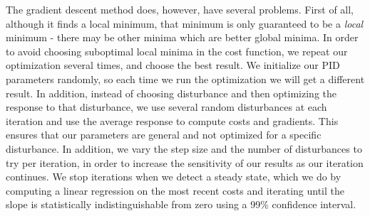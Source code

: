\documentclass{article}
\begin{document}
The gradient descent method does, however, have several problems. First of all, although it finds a
local minimum, that minimum is only guaranteed to be a \emph{local} minimum - there may be other
minima which are better global minima. In order to avoid choosing suboptimal local minima in the
cost function, we repeat our optimization several times, and choose the best result. We initialize
our PID parameters randomly, so each time we run the optimization we will get a different result. In
addition, instead of choosing disturbance and then optimizing the response to that disturbance, we
use several random disturbances at each iteration and use the average response to compute costs and
gradients. This ensures that our parameters are general and not optimized for a specific
disturbance. In addition, we vary the step size and the number of disturbances to try per iteration,
in order to increase the sensitivity of our results as our iteration continues. We stop iterations
when we detect a steady state, which we do by computing a linear regression on the most recent costs
and iterating until the slope is statistically indistinguishable from zero using a 99\% confidence
interval.
\end{document}
